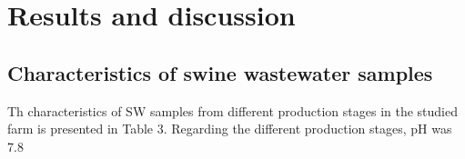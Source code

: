 \section{Results and discussion}
\subsection{Characteristics of swine wastewater samples}
Th characteristics of SW samples from different production stages in the studied farm is presented in Table 3. Regarding the different production stages, pH was 7.8